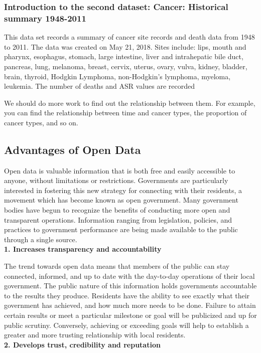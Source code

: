 \documentclass[a4paper, 11pt,twoside=true]{scrartcl}
\begin{document}
\subsubsection{Introduction to the second dataset: Cancer: Historical summary 1948-2011}
\qquad This data set records a summary of cancer site records and death data from 1948 to 2011. The data was created on May 21, 2018. Sites include: lips, mouth and pharynx, esophagus, stomach, large intestine, liver and intrahepatic bile duct, pancreas, lung, melanoma, breast, cervix, uterus, ovary, vulva, kidney, bladder, brain, thyroid, Hodgkin Lymphoma, non-Hodgkin's lymphoma, myeloma, leukemia. The number of deaths and ASR values are recorded

\quad We should do more work to find out the relationship between them. For example, you can find the relationship between time and cancer types, the proportion of cancer types, and so on.
\subsection{Advantages of Open Data}
\qquad Open data is valuable information that is both free and easily accessible to anyone, without limitations or restrictions. Governments are particularly interested in fostering this new strategy for connecting with their residents, a movement which has become known as open government. Many government bodies have begun to recognize the benefits of conducting more open and transparent operations. Information ranging from legislation, policies, and practices to government performance are being made available to the public through a single source.\\
\textbf{1. Increases transparency and accountability}

\quad The trend towards open data means that members of the public can stay connected, informed, and up to date with the day-to-day operations of their local government. The public nature of this information holds governments accountable to the results they produce. Residents have the ability to see exactly what their government has achieved, and how much more needs to be done. Failure to attain certain results or meet a particular milestone or goal will be publicized and up for public scrutiny. Conversely, achieving or exceeding goals will help to establish a greater and more trusting relationship with local residents.\\
\textbf{2. Develops trust, credibility and reputation}
\end{document}
